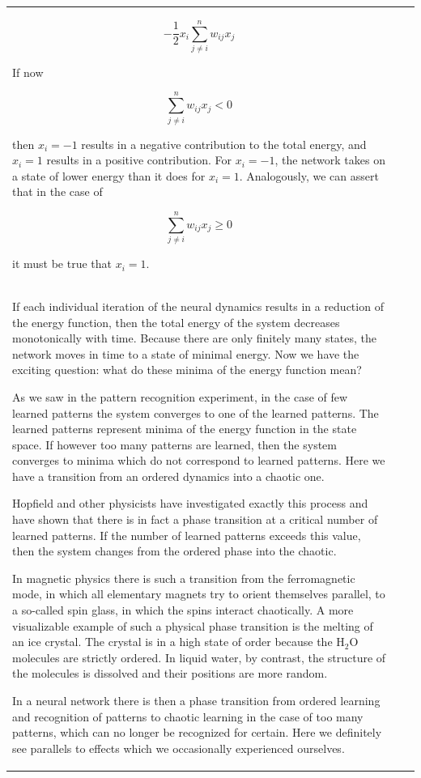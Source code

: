 \documentclass[10pt]{book}
\begin{document}
\begin{center}
\begin{tabular}{|l|l|l|}
$$
-\frac{1}{2} x_i \sum_{j \neq i}^{n} w_{ij} x_j
$$

If now

$$
\sum_{j \neq i}^{n} w_{ij} x_j < 0
$$

then $x_i=-1$ results in a negative contribution to the total energy, and $x_i=1$ results in a positive contribution. For $x_i=-1$, the network takes on a state of lower energy than it does for $x_i=1$. Analogously, we can assert that in the case of

$$
\sum_{j \neq i}^{n} w_{ij} x_j \geq 0
$$

it must be true that $x_i=1$.\\
If each individual iteration of the neural dynamics results in a reduction of the energy function, then the total energy of the system decreases monotonically with time. Because there are only finitely many states, the network moves in time to a state of minimal energy. Now we have the exciting question: what do these minima of the energy function mean?

As we saw in the pattern recognition experiment, in the case of few learned patterns the system converges to one of the learned patterns. The learned patterns represent minima of the energy function in the state space. If however too many patterns are learned, then the system converges to minima which do not correspond to learned patterns. Here we have a transition from an ordered dynamics into a chaotic one.

Hopfield and other physicists have investigated exactly this process and have shown that there is in fact a phase transition at a critical number of learned patterns. If the number of learned patterns exceeds this value, then the system changes from the ordered phase into the chaotic.

In magnetic physics there is such a transition from the ferromagnetic mode, in which all elementary magnets try to orient themselves parallel, to a so-called spin glass, in which the spins interact chaotically. A more visualizable example of such a physical phase transition is the melting of an ice crystal. The crystal is in a high state of order because the $\mathrm{H}_{2}\mathrm{O}$ molecules are strictly ordered. In liquid water, by contrast, the structure of the molecules is dissolved and their positions are more random.

In a neural network there is then a phase transition from ordered learning and recognition of patterns to chaotic learning in the case of too many patterns, which can no longer be recognized for certain. Here we definitely see parallels to effects which we occasionally experienced ourselves.


\end{tabular}
\end{center}
\end{document}
